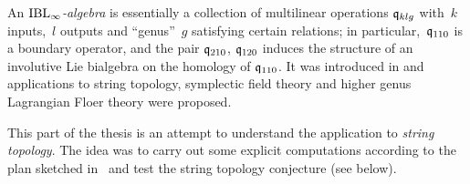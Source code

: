 \documentclass[\MainFolder/Text.tex]{subfiles}
\begin{document}
An \emph{$\mathrm{IBL}_\infty$-algebra} is essentially a collection of multilinear operations $\mathfrak{q}_{klg}$ with~$k$ inputs,~$l$ outputs and ``genus''~$g$ satisfying certain relations; in particular,~$\mathfrak{q}_{110}$ is a boundary operator, and the pair $\mathfrak{q}_{210}$, $\mathfrak{q}_{120}$ induces the structure of an involutive Lie bialgebra on the homology of $\mathfrak{q}_{110}$. It was introduced in \cite{Cieliebak2015} and applications to string topology, symplectic field theory and higher genus Lagrangian Floer theory were proposed.

This part of the thesis is an attempt to understand the application to \emph{string topology}. The idea was to carry out some explicit computations according to the plan sketched in~\cite[Section~13]{Cieliebak2015} and test the string topology conjecture (see below).

\end{document}
